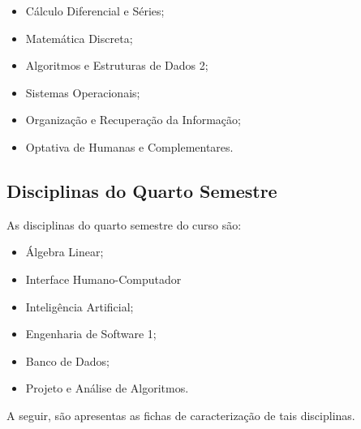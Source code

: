     \begin{itemize}
        \item Cálculo Diferencial e Séries;
        \item Matemática Discreta;
        \item Algoritmos e Estruturas de Dados 2;
        \item Sistemas Operacionais;
        \item Organização e Recuperação da Informação;
        \item Optativa de Humanas e Complementares.
    \end{itemize}

    
   
    

    
    
    
    
    
    
    
    
    
\subsection{Disciplinas do Quarto Semestre}

    As disciplinas do quarto semestre do curso são:
    
    \begin{itemize}
        \item Álgebra Linear;
        \item Interface Humano-Computador
        \item Inteligência Artificial;
        \item Engenharia de Software 1;
        \item Banco de Dados;
        \item Projeto e Análise de Algoritmos.
    \end{itemize}
    
    A seguir, são apresentas as fichas de caracterização de tais disciplinas.

    
    
    

    
    
    
    
    
    
    

